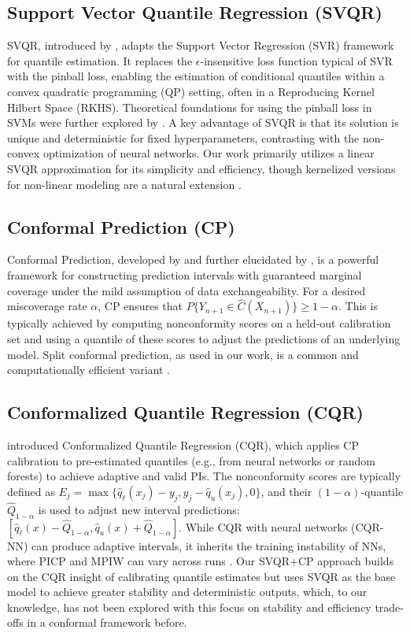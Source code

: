 \documentclass{article}
\begin{document}
\subsection{Support Vector Quantile Regression (SVQR)}
SVQR, introduced by \citet{Takeuchi2006NonparametricQE}, adapts the Support Vector Regression (SVR) framework for quantile estimation. It replaces the $\epsilon$-insensitive loss function typical of SVR with the pinball loss, enabling the estimation of conditional quantiles within a convex quadratic programming (QP) setting, often in a Reproducing Kernel Hilbert Space (RKHS). Theoretical foundations for using the pinball loss in SVMs were further explored by \citet{Steinwart2011EstimatingCQ}. A key advantage of SVQR is that its solution is unique and deterministic for fixed hyperparameters, contrasting with the non-convex optimization of neural networks. Our work primarily utilizes a linear SVQR approximation for its simplicity and efficiency, though kernelized versions for non-linear modeling are a natural extension \citep{Takeuchi2006NonparametricQE}.

\subsection{Conformal Prediction (CP)}
Conformal Prediction, developed by \citet{Vovk2005AlgorithmicLI} and further elucidated by \citet{Shafer2008TutorialOC}, is a powerful framework for constructing prediction intervals with guaranteed marginal coverage under the mild assumption of data exchangeability. For a desired miscoverage rate $\alpha$, CP ensures that $P\{Y_{n+1} \in \hat{C}(X_{n+1})\} \ge 1-\alpha$. This is typically achieved by computing nonconformity scores on a held-out calibration set and using a quantile of these scores to adjust the predictions of an underlying model. Split conformal prediction, as used in our work, is a common and computationally efficient variant \citep{Papadopoulos2002InductiveCP, Lei2018DistributionFreePC}.

\subsection{Conformalized Quantile Regression (CQR)}
\citet{Romano2019ConformalizedQR} introduced Conformalized Quantile Regression (CQR), which applies CP calibration to pre-estimated quantiles (e.g., from neural networks or random forests) to achieve adaptive and valid PIs. The nonconformity scores are typically defined as $E_j = \max\{ \hat{q}_{\ell}(x_j) - y_j, y_j - \hat{q}_{u}(x_j), 0 \}$, and their $(1-\alpha)$-quantile $\hat{Q}_{1-\alpha}$ is used to adjust new interval predictions: $[\hat{q}_{\ell}(x) - \hat{Q}_{1-\alpha}, \hat{q}_{u}(x) + \hat{Q}_{1-\alpha}]$.
While CQR with neural networks (CQR-NN) can produce adaptive intervals, it inherits the training instability of NNs, where PICP and MPIW can vary across runs \citep{Xu2020UnderTH, Park2022UnderstandingUB}. Our SVQR+CP approach builds on the CQR insight of calibrating quantile estimates but uses SVQR as the base model to achieve greater stability and deterministic outputs, which, to our knowledge, has not been explored with this focus on stability and efficiency trade-offs in a conformal framework before.
\end{document}
